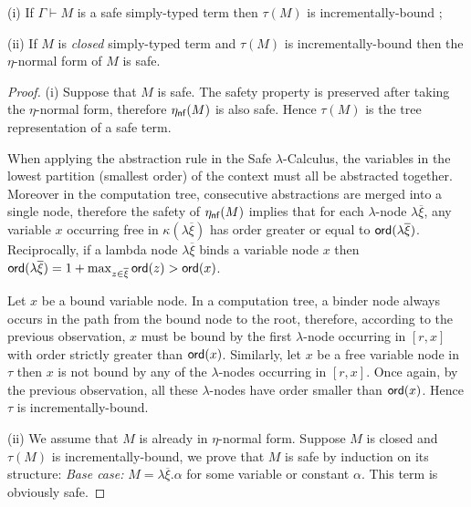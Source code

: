 \documentclass{llncs}
\newcommand\etanf[1]{\eta_{\sf nf}(#1)}
\newcommand\ord[1]{{\sf ord}(#1)}
\begin{document}
\begin{lemma}
\label{lem:safe_imp_incrbound} 

(i) If $\Gamma \vdash M$ is a safe simply-typed term then $\tau(M)$ is incrementally-bound ;

(ii) If $M$ is \emph{closed} simply-typed term and $\tau(M)$ is incrementally-bound then the $\eta$-normal form of $M$ is safe.
\end{lemma}
\begin{proof}
(i) Suppose that $M$ is safe. The safety property is preserved after
taking the $\eta$-normal form, therefore $\etanf{M}$ is also safe.
Hence $\tau(M)$ is the tree representation of a safe term.

When applying the abstraction rule in the Safe $\lambda$-Calculus,
the variables in the lowest partition (smallest order) of the
context must all be abstracted together. Moreover in the computation
tree, consecutive abstractions are merged into a single node,
therefore the safety of $\etanf{M}$ implies that for each
$\lambda$-node $\lambda \overline{\xi}$, any variable $x$ occurring
free in $\kappa(\lambda \overline{\xi})$ has order greater or equal
to $\ord{\lambda \overline{\xi}}$. Reciprocally, if a lambda node
$\lambda \overline{\xi}$ binds a variable node $x$ then
$\ord{\lambda \overline{\xi}} = 1+\max_{z\in\overline{\xi}} \ord{z}
> \ord{x}$.

Let $x$ be a bound variable node. In a computation tree, a binder
node always occurs in the path from the bound node to the root,
therefore, according to the previous observation, $x$ must be bound
by the first $\lambda$-node occurring in $[r,x]$ with order strictly
greater than $\ord{x}$. Similarly, let $x$ be a free variable node
in $\tau$ then $x$ is not bound by any of the $\lambda$-nodes
occurring in $[r,x]$. Once again, by the previous observation, all
these $\lambda$-nodes have order smaller than $\ord{x}$. Hence
$\tau$ is incrementally-bound.

(ii) We assume that $M$ is already in $\eta$-normal form. Suppose
$M$ is closed and $\tau(M)$ is incrementally-bound, we prove that
$M$ is safe by induction on its structure: \emph{Base case:} $M =
\lambda \overline{\xi} . \alpha$ for some variable or constant
$\alpha$. This term is obviously safe.


\end{proof}
\end{document}
